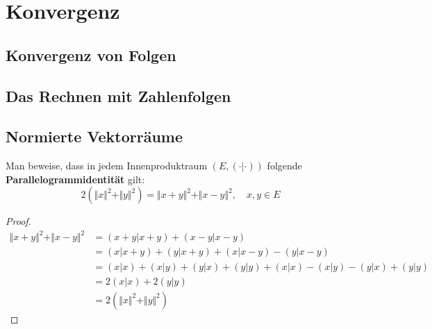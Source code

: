 \chapter{Konvergenz}
\section{Konvergenz von Folgen}
\section{Das Rechnen mit Zahlenfolgen}
\section{Normierte Vektorräume}
\setcounter{aufgabe}{3}
\begin{aufgabe}
	Man beweise, dass in jedem Innenproduktraum $(E, (\cdot | \cdot))$ folgende
	\textbf{Parallelogrammidentität} gilt:
	\[
		2 ( \Vert x \Vert^2 + \Vert y \Vert^2)
			= \Vert x + y \Vert^2 + \Vert x - y \Vert^2, \quad x, y \in E
	\]
\end{aufgabe}
\begin{proof}
	\begin{align*}
		\Vert x + y \Vert^2 + \Vert x - y \Vert^2
			&= (x+y | x+y) + (x-y | x-y) \\
			&= (x | x+y) + (y |x+y) + (x | x-y) - (y | x-y) \\
			&= (x|x) + (x|y) + (y|x) + (y|y) + (x|x) - (x|y) - (y|x) + (y|y) \\
			&= 2 (x|x) + 2(y|y) \\
			&= 2 ( \Vert x \Vert^2 + \Vert y \Vert^2 )
	\end{align*}
\end{proof}

